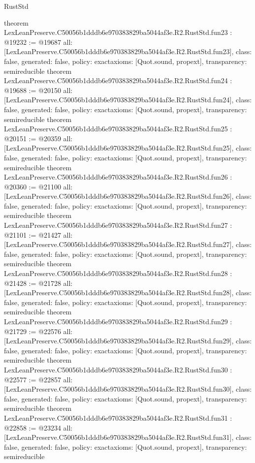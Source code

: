 \begin{lexlean}{RustStd}
\begin{coremodule}
{}
theorem LexLeanPreserve.C50056b1dddb6e970383829ba5044af3e.R2.RustStd.fun23 : @19232 := @19687 {
  all: [LexLeanPreserve.C50056b1dddb6e970383829ba5044af3e.R2.RustStd.fun23],
  class: false,
  generated: false,
  policy: exact{axioms: [Quot.sound, propext]},
  transparency: semireducible
}
theorem LexLeanPreserve.C50056b1dddb6e970383829ba5044af3e.R2.RustStd.fun24 : @19688 := @20150 {
  all: [LexLeanPreserve.C50056b1dddb6e970383829ba5044af3e.R2.RustStd.fun24],
  class: false,
  generated: false,
  policy: exact{axioms: [Quot.sound, propext]},
  transparency: semireducible
}
theorem LexLeanPreserve.C50056b1dddb6e970383829ba5044af3e.R2.RustStd.fun25 : @20151 := @20359 {
  all: [LexLeanPreserve.C50056b1dddb6e970383829ba5044af3e.R2.RustStd.fun25],
  class: false,
  generated: false,
  policy: exact{axioms: [Quot.sound, propext]},
  transparency: semireducible
}
theorem LexLeanPreserve.C50056b1dddb6e970383829ba5044af3e.R2.RustStd.fun26 : @20360 := @21100 {
  all: [LexLeanPreserve.C50056b1dddb6e970383829ba5044af3e.R2.RustStd.fun26],
  class: false,
  generated: false,
  policy: exact{axioms: [Quot.sound, propext]},
  transparency: semireducible
}
theorem LexLeanPreserve.C50056b1dddb6e970383829ba5044af3e.R2.RustStd.fun27 : @21101 := @21427 {
  all: [LexLeanPreserve.C50056b1dddb6e970383829ba5044af3e.R2.RustStd.fun27],
  class: false,
  generated: false,
  policy: exact{axioms: [Quot.sound, propext]},
  transparency: semireducible
}
theorem LexLeanPreserve.C50056b1dddb6e970383829ba5044af3e.R2.RustStd.fun28 : @21428 := @21728 {
  all: [LexLeanPreserve.C50056b1dddb6e970383829ba5044af3e.R2.RustStd.fun28],
  class: false,
  generated: false,
  policy: exact{axioms: [Quot.sound, propext]},
  transparency: semireducible
}
theorem LexLeanPreserve.C50056b1dddb6e970383829ba5044af3e.R2.RustStd.fun29 : @21729 := @22576 {
  all: [LexLeanPreserve.C50056b1dddb6e970383829ba5044af3e.R2.RustStd.fun29],
  class: false,
  generated: false,
  policy: exact{axioms: [Quot.sound, propext]},
  transparency: semireducible
}
theorem LexLeanPreserve.C50056b1dddb6e970383829ba5044af3e.R2.RustStd.fun30 : @22577 := @22857 {
  all: [LexLeanPreserve.C50056b1dddb6e970383829ba5044af3e.R2.RustStd.fun30],
  class: false,
  generated: false,
  policy: exact{axioms: [Quot.sound, propext]},
  transparency: semireducible
}
theorem LexLeanPreserve.C50056b1dddb6e970383829ba5044af3e.R2.RustStd.fun31 : @22858 := @23234 {
  all: [LexLeanPreserve.C50056b1dddb6e970383829ba5044af3e.R2.RustStd.fun31],
  class: false,
  generated: false,
  policy: exact{axioms: [Quot.sound, propext]},
  transparency: semireducible
}
\end{coremodule}
\end{lexlean}

